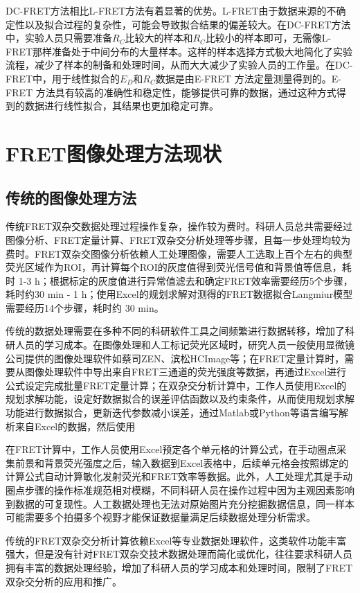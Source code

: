 DC-FRET方法相比L-FRET方法有着显著的优势。L-FRET由于数据来源的不确定性以及拟合过程的复杂性，可能会导致拟合结果的偏差较大。在DC-FRET方法中，实验人员只需要准备$R_C$比较大的样本和$R_C$比较小的样本即可，无需像L-FRET那样准备处于中间分布的大量样本。这样的样本选择方式极大地简化了实验流程，减少了样本的制备和处理时间，从而大大减少了实验人员的工作量。在DC-FRET中，用于线性拟合的$E_D$和$R_C$数据是由E-FRET 方法定量测量得到的。E-FRET 方法具有较高的准确性和稳定性，能够提供可靠的数据，通过这种方式得到的数据进行线性拟合，其结果也更加稳定可靠。
\fi

\section{FRET图像处理方法现状}

\subsection{传统的图像处理方法}

\ifshowtext
传统FRET双杂交数据处理过程操作复杂，操作较为费时。科研人员总共需要经过图像分析、FRET定量计算、FRET双杂交分析处理等步骤，且每一步处理均较为费时。FRET双杂交图像分析依赖人工处理图像，需要人工选取上百个左右的典型荧光区域作为ROI，再计算每个ROI的灰度值得到荧光信号值和背景值等信息，耗时 1-3 h；根据标定的灰度值进行异常值滤去和确定FRET效率需要经历5个步骤，耗时约30 min - 1 h；使用Excel的规划求解对测得的FRET数据拟合Langmiur模型需要经历14个步骤，耗时约 30 min。

传统的数据处理需要在多种不同的科研软件工具之间频繁进行数据转移，增加了科研人员的学习成本。在图像处理和人工标记荧光区域时，研究人员一般使用显微镜公司提供的图像处理软件如蔡司ZEN、滨松HCImage等；在FRET定量计算时，需要从图像处理软件中导出来自FRET三通道的荧光强度等数据，再通过Excel进行公式设定完成批量FRET定量计算；在双杂交分析计算中，工作人员使用Excel的规划求解功能，设定好数据拟合的误差评估函数以及约束条件，从而使用规划求解功能进行数据拟合，更新迭代参数减小误差，通过Matlab或Python等语言编写解析来自Excel的数据，然后使用

在FRET计算中，工作人员使用Excel预定各个单元格的计算公式，在手动圈点采集前景和背景荧光强度之后，输入数据到Excel表格中，后续单元格会按照绑定的计算公式自动计算敏化发射荧光和FRET效率等数据。此外，人工处理尤其是手动圈点步骤的操作标准规范相对模糊，不同科研人员在操作过程中因为主观因素影响到数据的可复现性。人工数据处理也无法对原始图片充分挖掘数据信息，同一样本可能需要多个拍摄多个视野才能保证数据量满足后续数据处理分析需求。

传统的FRET双杂交分析计算依赖Excel等专业数据处理软件，这类软件功能丰富强大，但是没有针对FRET双杂交技术数据处理而简化或优化，往往要求科研人员拥有丰富的数据处理经验，增加了科研人员的学习成本和处理时间，限制了FRET双杂交分析的应用和推广。
\fi

